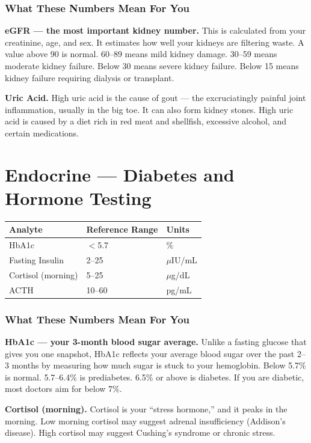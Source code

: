 \subsubsection{What These Numbers Mean For You}

\textbf{eGFR --- the most important kidney number.} This is calculated from your creatinine, age, and sex. It estimates how well your kidneys are filtering waste. A value above 90 is normal. 60--89 means mild kidney damage. 30--59 means moderate kidney failure. Below 30 means severe kidney failure. Below 15 means kidney failure requiring dialysis or transplant.

\textbf{Uric Acid.} High uric acid is the cause of gout --- the excruciatingly painful joint inflammation, usually in the big toe. It can also form kidney stones. High uric acid is caused by a diet rich in red meat and shellfish, excessive alcohol, and certain medications.

\clearpage
\section{Endocrine --- Diabetes and Hormone Testing}

\begin{longtable}{@{}lll@{}}
\toprule
\textbf{Analyte} & \textbf{Reference Range} & \textbf{Units} \\
\midrule
HbA1c & $<$5.7 & \% \\
Fasting Insulin & 2--25 & $\mu$IU/mL \\
Cortisol (morning) & 5--25 & $\mu$g/dL \\
ACTH & 10--60 & pg/mL \\
\bottomrule
\end{longtable}

\subsubsection{What These Numbers Mean For You}

\textbf{HbA1c --- your 3-month blood sugar average.} Unlike a fasting glucose that gives you one snapshot, HbA1c reflects your average blood sugar over the past 2--3 months by measuring how much sugar is stuck to your hemoglobin. Below 5.7\% is normal. 5.7--6.4\% is prediabetes. 6.5\% or above is diabetes. If you are diabetic, most doctors aim for below 7\%.

\textbf{Cortisol (morning).} Cortisol is your ``stress hormone,'' and it peaks in the morning. Low morning cortisol may suggest adrenal insufficiency (Addison's disease). High cortisol may suggest Cushing's syndrome or chronic stress.

